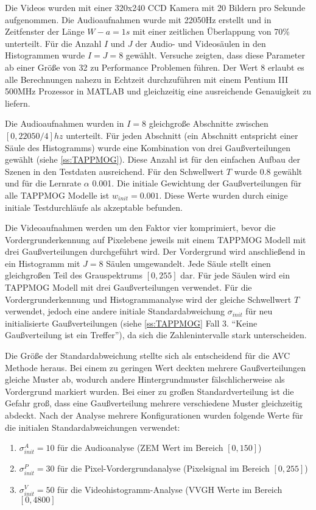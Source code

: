 Die Videos wurden mit einer 320x240 CCD Kamera mit 20 Bildern pro Sekunde aufgenommen. Die Audioaufnahmen wurde mit 22050Hz erstellt und in Zeitfenster der Länge $W-a = 1s$ mit einer zeitlichen Überlappung von 70\% unterteilt.   
Für die Anzahl $I$ und $J$ der Audio- und Videosäulen in den Histogrammen wurde $I = J = 8$ gewählt. Versuche zeigten, dass diese Parameter ab einer Größe von 32 zu Performance Problemen führen. Der Wert 8 erlaubt es alle Berechnungen nahezu in Echtzeit durchzuführen mit einem Pentium III 500MHz Prozessor in MATLAB und gleichzeitig eine ausreichende Genauigkeit zu liefern.   

Die Audioaufnahmen wurden in $I = 8$ gleichgroße Abschnitte zwischen $[0, 22050/4]hz$ unterteilt. Für jeden Abschnitt (ein Abschnitt entspricht einer Säule des Histogramms) wurde eine Kombination von drei Gaußverteilungen gewählt (siehe  \ref{ss:TAPPMOG}). Diese Anzahl ist für den einfachen Aufbau der Szenen in den Testdaten ausreichend. Für den Schwellwert $T$ wurde 0.8 gewählt und für die Lernrate $\alpha$ 0.001. Die initiale Gewichtung der Gaußverteilungen für alle TAPPMOG Modelle ist $w_{init} = 0.001$. Diese Werte wurden durch einige initiale Testdurchläufe als akzeptable befunden.

Die Videoaufnahmen werden um den Faktor vier komprimiert, bevor die Vordergrunderkennung auf Pixelebene jeweils mit einem TAPPMOG Modell mit drei Gaußverteilungen durchgeführt wird. Der Vordergrund wird anschließend in ein Histogramm mit $J = 8$ Säulen umgewandelt. Jede Säule stellt einen gleichgroßen Teil des Grauspektrums $[0, 255]$ dar. Für jede Säulen wird ein TAPPMOG Modell mit drei Gaußverteilungen verwendet. Für die Vordergrunderkennung und Histogrammanalyse  wird der gleiche Schwellwert $T$ verwendet, jedoch eine andere initiale Standardabweichung $\sigma_{init}$ für neu initialisierte Gaußverteilungen (siehe \ref{ss:TAPPMOG} Fall 3. ``Keine Gaußverteilung ist ein Treffer''), da sich die Zahlenintervalle stark unterscheiden.

Die Größe der Standardabweichung stellte sich als entscheidend für die AVC Methode heraus. Bei einem zu geringen Wert deckten mehrere Gaußverteilungen gleiche Muster ab, wodurch andere Hintergrundmuster fälschlicherweise als Vordergrund markiert wurden. Bei einer zu großen Standardverteilung ist die Gefahr groß, dass eine Gaußverteilung mehrere verschiedene Muster gleichzeitig abdeckt.   
Nach der Analyse mehrere Konfigurationen wurden folgende Werte für die initialen Standardabweichungen verwendet:
\begin{enumerate}
\item $\sigma_{init}^A = 10$ für die Audioanalyse (ZEM Wert im Bereich $[0, 150]$)
\item $\sigma_{init}^P = 30$ für die Pixel-Vordergrundanalyse (Pixelsignal im Bereich $[0, 255]$)
\item $\sigma_{init}^V = 50$ für die Videohistogramm-Analyse (VVGH Werte im Bereich $[0, 4800]$
\end{enumerate}

